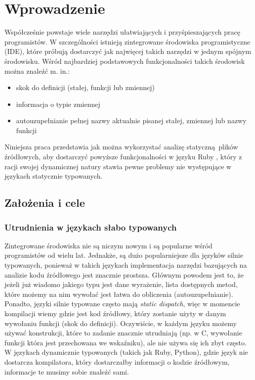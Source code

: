 \documentclass[shortabstract,mgr]{iithesis}
\author         {Rafał Łasocha}
\begin{document}
\chapter{Wprowadzenie}

Współcześnie powstaje wiele narzędzi ułatwiających i przyśpieszających pracę programistów.
W szczególności istnieją zintegrowane środowiska programistyczne (IDE), które próbują dostarczyć jak najwięcej takich narzędzi w jednym spójnym środowisku. Wśród najbardziej podstawowych funkcjonalności takich środowisk można znaleźć m. in.:

\begin{itemize}
\item skok do definicji (stałej, funkcji lub zmiennej)
\item informacja o typie zmiennej
\item autouzupełnianie pełnej nazwy aktualnie pisanej stałej, zmiennej lub nazwy funkcji
\end{itemize}

Niniejsza praca przedstawia jak można wykorzystać analizę statyczną plików źródłowych, aby dostarczyć powyższe funkcjonalności w języku Ruby \cite{RUBY}, który z racji swojej dynamicznej natury stawia pewne problemy nie występujące w językach statycznie typowanych.

\section{Założenia i cele}

\subsection{Utrudnienia w językach słabo typowanych}

Zintegrowane środowiska nie są niczym nowym i są popularne wśród programistów od wielu lat.
Jednakże, są dużo popularniejsze dla języków silnie typowanych, ponieważ w takich językach implementacja narzędzi bazujących na analizie kodu źródłowego jest znacznie prostsza. Głównym powodem jest to, że jeżeli już wiadomo jakiego typu jest dane wyrażenie, lista dostępnych metod, które możemy na nim wywołać jest łatwa do obliczenia (autouzupełnianie).
Ponadto, języki silnie typowane często mają \textit{static dispatch}, więc w momencie kompilacji wiemy gdzie jest kod źródłowy, który zostanie użyty w danym wywołaniu funkcji (skok do definicji).
Oczywiście, w każdym języku możemy używać konstrukcji, które to zadanie znacznie utrudniają (np. w C, wywołanie funkcji która jest przechowana we wskaźniku), ale nie używa się ich zbyt często.
W językach dynamicznie typowanych (takich jak Ruby, Python), gdzie język nie dostarcza kompilatora, który dostarczałby informacji o kodzie źródłowym, informacje te musimy sobie znaleźć sami.
\end{document}
